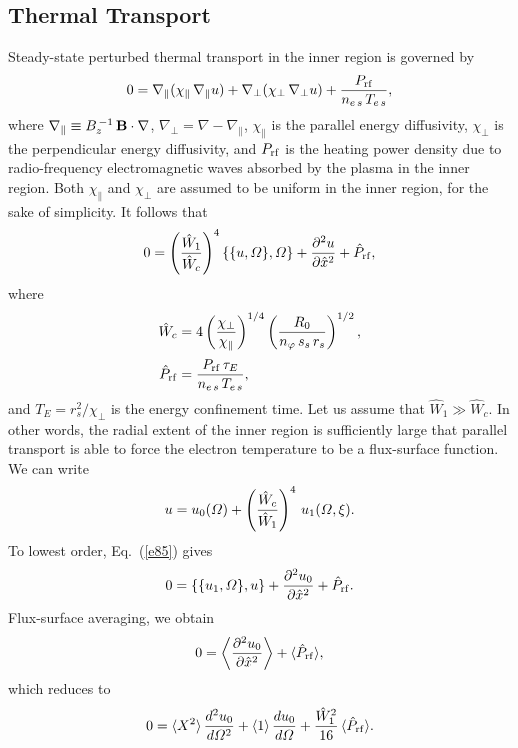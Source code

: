 \documentclass[12pt,prb,aps]{revtex4-1}
\begin{document}
\subsection{Thermal Transport}
Steady-state perturbed thermal transport in the inner region is
governed by
\begin{equation}
0 = \nabla_\parallel(\chi_\parallel\,\nabla_\parallel u)+ 
\nabla_\perp(\chi_\perp\,\nabla_\perp u) + \frac{P_{\rm rf}}{n_{e\,s}\,T_{e\,s}},
\end{equation}
where $\nabla_\parallel \equiv B_z^{\,-1}\,{\bf B}\cdot\nabla$,
$\nabla_\perp = \nabla - \nabla_\parallel$, $\chi_\parallel$ is the
parallel energy diffusivity, $\chi_\perp$ is the perpendicular
energy diffusivity, and $P_{\rm rf}$ is the heating power density due to radio-frequency electromagnetic waves absorbed by the plasma in the inner region. Both $\chi_\parallel$ and $\chi_\perp$ are assumed to be uniform in the inner region, for the sake of simplicity. 
It follows that
\begin{equation}\label{e85}
0 = \left(\frac{\hat{W}_1}{\hat{W}_c}\right)^4\{\{u,{\mit\Omega}\},{\mit\Omega}\} + \frac{\partial^2 u}{\partial\hat{x}^2}+\hat{P}_{\rm rf},
\end{equation}
where
\begin{align}
\hat{W}_c &= 4\left(\frac{\chi_\perp}{\chi_\parallel}\right)^{1/4}\left(\frac{R_0}{n_\varphi\,s_s\,r_s}\right)^{1/2},\\[0.5ex]
\hat{P}_{\rm rf} &= \frac{P_{\rm rf}\,\tau_E}{n_{e\,s}\,T_{e\,s}},
\end{align}
and $T_E=r_s^2/\chi_\perp$ is the energy confinement time. 
Let us assume that $\hat{W}_1\gg \hat{W}_c$. In other words, the
radial extent of the inner region is sufficiently large that parallel transport is able to force the electron temperature to be a flux-surface function.\cite{fitz}
We can write
\begin{equation}
u= u_0({\mit\Omega})+\left(\frac{\hat{W}_c}{\hat{W}_1}\right)^4\,u_1({\mit\Omega},\xi).
\end{equation}
To lowest order, Eq.~(\ref{e85}) gives
\begin{equation}
0 = \{\{u_1,{\mit\Omega}\},u\} + \frac{\partial^2 u_0}{\partial\hat{x}^2}+ \hat{P}_{\rm rf}.
\end{equation}
Flux-surface averaging, we obtain
\begin{equation}
0=\left\langle \frac{\partial^2 u_0}{\partial\hat{x}^2}
\right\rangle + \langle \hat{P}_{\rm rf}\rangle,
\end{equation}
which reduces to
\begin{equation}
0=\langle X^2\rangle \,\frac{d^2u_0}{d{\mit\Omega}^2} +\langle 1\rangle\,\frac{du_0}{d{\mit\Omega}} + \frac{\hat{W}_1^2}{16}\,\langle \hat{P}_{\rm rf}\rangle.
\end{equation}
\end{document}
